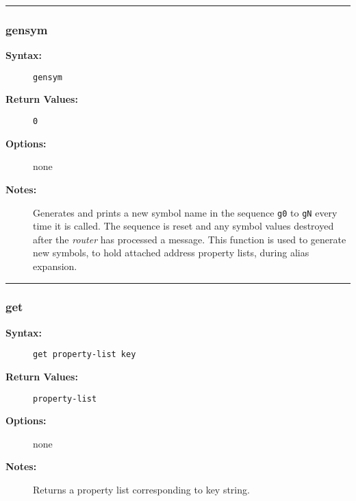 \hrule
\subsubsection{gensym}

\begin{description}
\item[{\bf Syntax:}] \mbox{}

{\tt gensym}

\item[{\bf Return Values:}] \mbox{}

\begin{description}
\item[{\tt 0}] \mbox{}



\end{description}


\item[{\bf Options:}] \mbox{}

none  

\item[{\bf Notes:}] \mbox{}

Generates and prints a new symbol name in the 
sequence {\tt g0} to {\tt gN} every time it is called. The 
sequence is reset and any symbol values destroyed after the {\em router} 
has processed a message. This function is used to generate new symbols, to 
hold attached address property lists, during alias expansion.

\end{description}


\hrule
\subsubsection{get}

\begin{description}
\item[{\bf Syntax:}] \mbox{}

{\tt get property-list key}

\item[{\bf Return Values:}] \mbox{}

{\tt property-list}

\item[{\bf Options:}] \mbox{}

none  

\item[{\bf Notes:}] \mbox{}

Returns a property list corresponding to key string.

\end{description}


